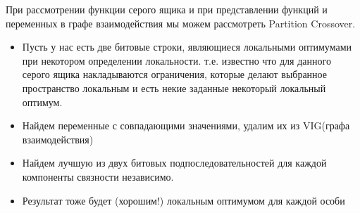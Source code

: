 При рассмотрении функции серого ящика и при представлении функций и переменных в графе взаимодействия мы можем рассмотреть Partition Crossover.\\
\begin{itemize}
    \item Пусть у нас есть две битовые строки, являющиеся локальными оптимумами при некотором определении локальности. т.е. известно что для данного серого ящика накладываются ограничения, которые делают выбранное пространство локальным и есть некие заданные некоторый локальный оптимум.
    \item Найдем переменные с совпадающими значениями, удалим их из VIG(графа взаимодействия)
    \item Найдем лучшую из двух битовых подпоследовательностей для каждой компоненты связности независимо.
    \item Результат тоже будет (хорошим!) локальным оптимумом для каждой особи
\end{itemize}


